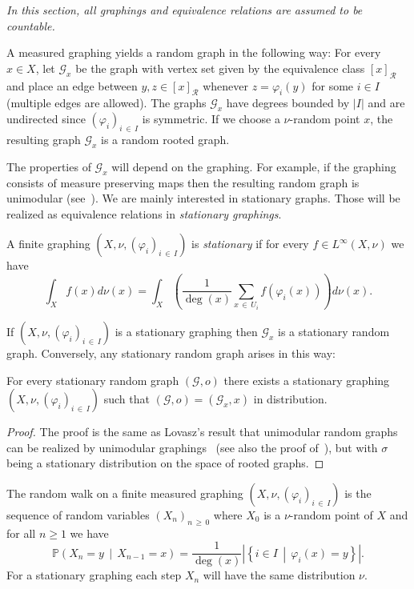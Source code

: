 \documentclass[AHL,Unicode,longabstracts,published]{cedram}
\newcommand{\bbP}{\mathbb{P}}
\newcommand{\calR}{\mathcal{R}}
\newcommand{\calG}{\mathcal{G}}
\begin{document}
\emph{In this section, all graphings and equivalence relations are assumed to be countable.}

A measured graphing yields a random graph in the following way: For every $x\in X$, let $\calG_x$ be the graph with vertex set given by the equivalence class $[x]_{\calR}$ and place an edge between $y,z\in [x]_{\calR}$ whenever $z=\varphi_i(y)$ for some $i\in I$ (multiple edges are allowed). The graphs $\calG_x$ have degrees bounded by $|I|$ and are undirected since $(\varphi_i)_{i\,\in\,I}$ is symmetric. If we choose a $\nu$-random point $x$, the resulting graph $\calG_x$ is a random rooted graph.

The properties of $\calG_x$ will depend on the graphing. For example, if the graphing consists of measure preserving maps then the resulting random graph is unimodular (see~\cite{ALR2007}). We are mainly interested in stationary graphs. Those will be realized as equivalence relations in \emph{stationary graphings}.
\begin{defi}
A finite graphing $(X, \nu, (\varphi_i)_{i\,\in \,I})$ is \emph{stationary} if for every $f\in L^\infty(X,\nu)$ we have
\[
\int_X f(x)d\nu(x)=\int_X \left(\frac{1}{\deg(x)}\sum_{x\,\in\,U_i}f(\varphi_i(x))\right)d\nu(x).
\]
\end{defi}

If $(X, \nu, (\varphi_i)_{i\,\in\,I})$ is a stationary graphing then $\calG_x$ is a stationary random graph. Conversely, any stationary random graph arises in this way:

\begin{lemm}\label{lem:BernoulliGraphing}
For every stationary random graph $(\calG,o)$ there exists a stationary graphing $(X,\nu,(\varphi_i)_{i\,\in\,I})$ such that $(\calG,o)=(\calG_x,x)$ in distribution.
\end{lemm}

\begin{proof}
The proof is the same as Lovasz's result that unimodular random graphs can be realized by unimodular graphings~\cite[Theorem~18.37]{Lovasz} (see also the proof of~\cite[Proposition~14]{AGV14}), but with $\sigma$ being a stationary distribution on the space of rooted graphs.
\end{proof}

The random walk on a finite measured graphing $(X,\nu, (\varphi_i)_{i\,\in\,I})$ is the sequence of random variables $(X_n)_{n\,\geq\,0}$ where $X_0$ is a $\nu$-random point of $X$ and for all $n\geq 1$ we have
\[
\bbP\left(X_n=y \,\middle|\, X_{n-1}=x\right)=\frac{1}{\deg(x)}\left|\left\{i\in I \,\middle|\, \varphi_i(x)=y\right\}\right|.
\]
For a stationary graphing each step $X_n$ will have the same distribution $\nu$.
\end{document}
